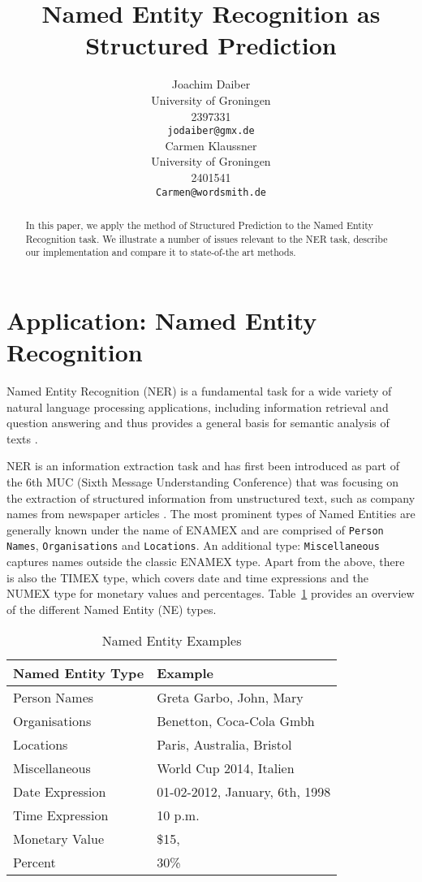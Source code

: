 \documentclass[11pt]{article}
\title{Named Entity Recognition as Structured Prediction}
\author{Joachim Daiber \\
  University of Groningen \\
  2397331\\
  {\tt jodaiber@gmx.de} \\\And
  Carmen Klaussner \\
  University of Groningen \\
  2401541\\
  {\tt Carmen@wordsmith.de} \\}
\date{}
\begin{document}
\maketitle

\begin{abstract}
In this paper, we apply the method of Structured Prediction to the Named Entity Recognition task. %
We illustrate a number of issues relevant to the NER task, describe our implementation and compare it to state-of-the art methods.
\end{abstract}


\section{Application: Named Entity Recognition}

Named Entity Recognition (NER) is a fundamental task for a wide variety of natural language processing applications, including information retrieval and question answering
and thus provides a general basis for semantic analysis of texts \cite{Chen:2010:UDB:1870457.1870473}.

NER is an information extraction task and has first been introduced as part of the 6th MUC (Sixth Message Understanding Conference)
that was focusing on the extraction of structured information from unstructured text, such as company names from newspaper articles \cite{nadeau2007survey}.
The most prominent types of Named Entities are generally known under the name of ENAMEX and are comprised of \texttt{Person Names}, \texttt{Organisations} and \texttt{Locations}.
An additional type: \texttt{Miscellaneous} captures names outside the classic ENAMEX type.
Apart from the above, there is also the TIMEX type, which covers date and time expressions and the NUMEX type for monetary values and percentages.
Table~\ref{table:NETypes} provides an overview of the different Named Entity (NE) types.

\begin{table}[h!]
\small
\begin{tabular}{ l l }
\bf Named Entity Type & \bf Example \\
\hline 
Person Names & Greta Garbo, John, Mary \\
Organisations& Benetton, Coca-Cola Gmbh\\
Locations&  Paris, Australia, Bristol\\
Miscellaneous& World Cup 2014, Italien\\
 Date Expression& 01-02-2012, January, 6th, 1998 \\
Time Expression & 10 p.m.\\
Monetary Value &  \$15, \textsterling 100    \\
Percent &   30\% \\
\end{tabular}
\caption{Named Entity Examples}
\label{table:NETypes}
\end{table}
\end{document}
